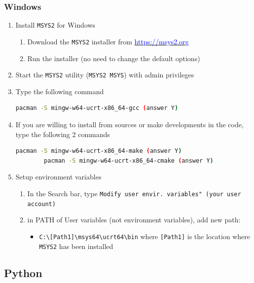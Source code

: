 \subsubsection{Windows}
\begin{enumerate}
    \item Install \texttt{MSYS2} for Windows
    \begin{enumerate}
        \item Download the \texttt{MSYS2} installer from \href{https://msys2.org}{\textcolor{blue}{https://msys2.org}}
        \item Run the installer (no need to change the default options)
    \end{enumerate}
    
    \item Start the \texttt{MSYS2} utility (\texttt{MSYS2 MSYS}) with admin privileges

    \item Type the following command
    \begin{lstlisting}[language=bash]
        pacman -S mingw-w64-ucrt-x86_64-gcc (answer Y)
    \end{lstlisting}
   
    \item If you are willing to install from sources or make developments in the code, type the following 2 commands
    \begin{lstlisting}[language=bash]
        pacman -S mingw-w64-ucrt-x86_64-make (answer Y)
        pacman -S mingw-w64-ucrt-x86_64-cmake (answer Y)
    \end{lstlisting}

    \item Setup environment variables
    \begin{enumerate}
        \item In the Search bar, type \texttt{Modify user envir. variables" (your user account)}
        \item in PATH of User variables (not environment variables), add new path:
        \begin{itemize}
            \item \lstinline{C:\[Path1]\msys64\ucrt64\bin} where \lstinline{[Path1]} is the location where \texttt{MSYS2} has been installed
        \end{itemize}
    \end{enumerate}
\end{enumerate}

\subsection{Python}

